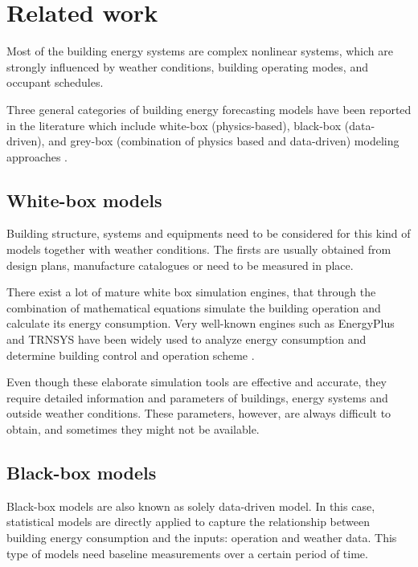 \documentclass[3p,times,procedia]{elsarticle}
\begin{document}

\section{Related work}

Most of the building energy systems are complex nonlinear systems, which are strongly influenced by weather conditions, building operating modes, and occupant schedules.

Three general categories of building energy forecasting models have been reported in the literature which include white-box (physics-based), black-box (data-driven), and grey-box (combination of physics based and data-driven) modeling approaches \cite{li2014review}.

\subsection{White-box models}


Building structure, systems and equipments need to be considered for this kind of models together with weather conditions. The firsts are usually obtained from design plans, manufacture catalogues or need to be measured in place.

There exist a lot of mature white box simulation engines, that through the combination of mathematical equations simulate the building operation and calculate its energy consumption. Very well-known engines such as EnergyPlus \cite{crawley2001energyplus} and TRNSYS \cite{TRNSYS} have been widely used to analyze energy consumption and determine building control and operation scheme \cite{crawley2008contrasting}.

Even though these elaborate simulation tools are effective and accurate, they require detailed information and parameters of buildings, energy systems and outside weather conditions. These parameters, however, are always difficult to obtain, and sometimes they might not be available.

\subsection{Black-box models}


Black-box models are also known as solely data-driven model. In this case, statistical models are directly applied to capture the relationship between building energy consumption and the inputs: operation and weather data. This type of models need baseline measurements over a certain period of time.
\end{document}
